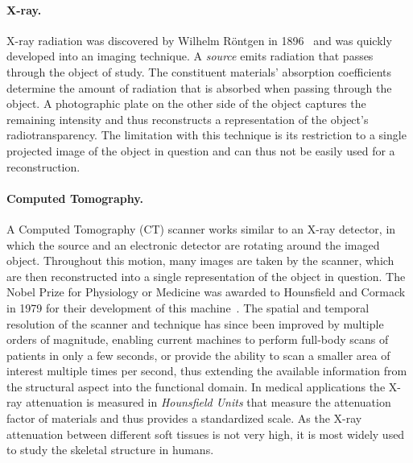 \paragraph{X-ray. } X-ray radiation was discovered by Wilhelm R\"ontgen in 1896~\cite{rontgen1896xray} and was quickly developed into an imaging technique.  A \emph{source} emits radiation that passes through the object of study.  The constituent materials' absorption coefficients determine the amount of radiation that is absorbed when passing through the object.  A photographic plate on the other side of the object captures the remaining intensity and thus reconstructs a representation of the object's radiotransparency.  The limitation with this technique is its restriction to a single  projected image of the object in question and can thus not be easily used for a  reconstruction.

\paragraph{Computed Tomography. }  A Computed Tomography (CT) scanner works similar to an X-ray detector, in which the source and an electronic detector are rotating around the imaged object.  Throughout this motion, many images are taken by the scanner, which are then reconstructed into a single  representation of the object in question.  The Nobel Prize for Physiology or Medicine was awarded to Hounsfield and Cormack in 1979 for their development of this machine~\cite{hounsfield1980computed}.  The spatial and temporal resolution of the scanner and technique has since been improved by multiple orders of magnitude, enabling current machines to perform full-body scans of patients in only a few seconds, or provide the ability to scan a smaller area of interest multiple times per second, thus extending the available information from the structural aspect into the functional domain.  In medical applications the X-ray attenuation is measured in \emph{Hounsfield Units} that measure the attenuation factor of materials and thus provides a standardized scale.  As the X-ray attenuation between different soft tissues is not very high, it is most widely used to study the skeletal structure in humans.

